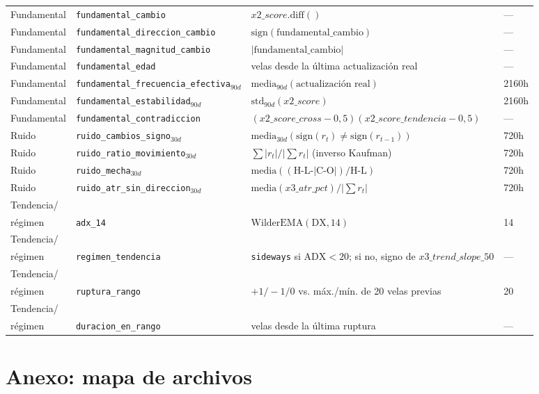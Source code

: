 \documentclass[11pt,a4paper]{article}
\newcommand{\code}[1]{\texttt{\small #1}}
\begin{document}
\begin{longtable}{@{}p{2.3cm} p{3.4cm} p{7.0cm} p{2.0cm}@{}}
Fundamental & \code{fundamental\_cambio} & \(x2\_score.\mathrm{diff}()\) & — \\
Fundamental & \code{fundamental\_direccion\_cambio} &
  \(\mathrm{sign}(\text{fundamental\_cambio})\) & — \\
Fundamental & \code{fundamental\_magnitud\_cambio} &
  \(|\text{fundamental\_cambio}|\) & — \\
Fundamental & \code{fundamental\_edad} & velas desde la última actualización real & — \\
Fundamental & \code{fundamental\_frecuencia\_efectiva}\(_{90d}\) &
  \(\mathrm{media}_{90d}(\text{actualización real})\) & 2160h \\
Fundamental & \code{fundamental\_estabilidad}\(_{90d}\) & \(\mathrm{std}_{90d}(x2\_score)\)
  & 2160h \\
Fundamental & \code{fundamental\_contradiccion} &
  \((x2\_score\_cross{-}0{,}5)(x2\_score\_tendencia{-}0{,}5)\) & — \\
Ruido & \code{ruido\_cambios\_signo}\(_{30d}\) &
  \(\mathrm{media}_{30d}(\mathrm{sign}(r_t)\neq\mathrm{sign}(r_{t-1}))\) & 720h \\
Ruido & \code{ruido\_ratio\_movimiento}\(_{30d}\) &
  \(\sum|r_t| / |\sum r_t|\) (inverso Kaufman) & 720h \\
Ruido & \code{ruido\_mecha}\(_{30d}\) &
  \(\mathrm{media}((\text{H-L-}|\text{C-O}|)/\text{H-L})\) & 720h \\
Ruido & \code{ruido\_atr\_sin\_direccion}\(_{30d}\) &
  \(\mathrm{media}(x3\_atr\_pct)/|\sum r_t|\) & 720h \\
Tendencia/\\régimen & \code{adx\_14} & \(\mathrm{WilderEMA}(\mathrm{DX},14)\) & 14 \\
Tendencia/\\régimen & \code{regimen\_tendencia} &
  \code{sideways} si \(\mathrm{ADX}{<}20\); si no, signo de
  \(x3\_trend\_slope\_50\) & — \\
Tendencia/\\régimen & \code{ruptura\_rango} &
  \(+1/-1/0\) vs. máx./mín. de 20 velas previas & 20 \\
Tendencia/\\régimen & \code{duracion\_en\_rango} & velas desde la última ruptura & — \\
\end{longtable}

\section*{Anexo: mapa de archivos}
\end{document}
